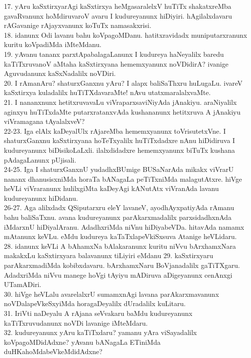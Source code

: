 \documentclass{article}
\begin{document}
17. yAru kaSxtirxyarAgi kaSxtirxya heMgasaralelxV huTiTx shakatxreMba gavaRvanunx hoMdiruvaroV avaru I kudureyanunx hiDiyiri. hAgilalxdavaru rAGavanige rAjayxvanunx koTuTx namasakxrisi.\\
18. idanunx Odi lavanu bahu koVpagoMDanu. hatitxravidadx muniputarxranunx kuritu koVpadiMda iMteMdanu.\\
19. yAvanu tananx parxtApabalagaLanunx I kudureya haNeyalilx baredu kaTiTxruvanoV aMtaha kaSxtirxyana hememxyanunx noVDidirA? ivanige Aguvudanunx kaSxNadalilx noVDiri.\\
20. I rAmanAru? shaturxGanxnu yAru? I alapx baliSaThxru huLugaLu. ivareV kaSxtirxya kuladalilx huTiTXdavaraMte! nAvu utatxmaralalxvaMte.\\
21. I nananxnunx hetitxruvavaLu viVraparxsaviNiyAda jAnakiyu. araNiyalilx aginxyu huTiTxdaMte putarxratanxvAda kushananunx hetitxruva A jAnakiyu viVramagana tAyalalxveV?\\
22-23. Iga elAlx kaDeyalUlx rAjareMba hememxyanunx toVrisutetxVne. I shaturxGanxnu kaSxtirxyana hoTeTxyalilx huTiTxdadxre nAnu hiDidiruva I kudureyanunx biDisikoLaLxli. ilalxdidadxre hememxyanunx biTuTx kushana pAdagaLanunx pUjisali.\\
24-25. Iga I shaturxGanxnU yudadhxBUmige BUSaNarAda mikakx viVrarU nananx dhanusisxniMda horaTa bANagaLa peTiTxniMda malagutAtxre. hiVge heVLi viVraranunx hulilxgiMta kaDeyAgi kANutAtx viVranAda lavanu kudureyanunx hiDidanu.\\
26-27. Aga alilxdadx QSiputarxru eleY lavaneV, ayodhAyxpatiyAda rAmanu bahu baliSaTxnu. avana kudureyanunx parAkarxmadalilx parxsidadhxnAda iMdarxnU hiDiyalAranu. AdadhxriMda niVnu hiDiyabeVDa. hitavAda namamx mAtanunx keVLu. eMdu kudureya kaTaTxlapeVkiSxsuva Atanige heVLidaru.\\
28. idanunx keVLi A bAhamxNa bAlakaranunx kuritu niVvu bArxhamxNara makakxLu kaSxtirxyara balavanunx tiLiyiri eMdanu
29. kaSxtirxyaru parAkarxmadiMda kobibxdavaru. bArxhamxNaru BoVjanadalilx gaTiTXgaru. AdadxriMda niVvu manege hoVgi tAyiyu mADiruva aDigeyanunx cenAnxgi UTamADiri.\\
30. hiVge heVLalu avarelalxrU sumamxnAgi lavana parAkarxmavanunx noVDalapeVkeSxyiMda horagaDeyalilx dUradalilx kuLitaru.\\
31. IriVti naDeyalu A rAjana seVvakaru baMdu kudureyanunx kaTiTxruvudanunx noVDi lavanige iMteMdaru.\\
32. kudureyanunx yAru kaTiTxdaru? yamanu yAra viSayadalilx koVpagoMDidAdxne? yAvanu bANagaLa ETiniMda duHKahoMdabeVkeMdidAdxne?\\
\end{document}
